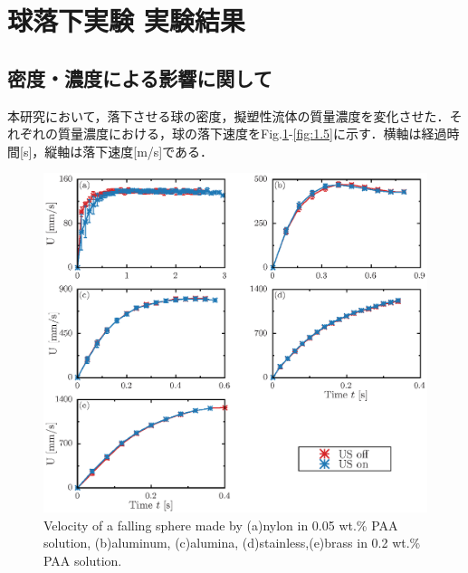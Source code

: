 \section{球落下実験 実験結果}
\label{sec:expData}

\subsection{密度・濃度による影響に関して}
本研究において，落下させる球の密度，擬塑性流体の質量濃度を変化させた．それぞれの質量濃度における，球の落下速度をFig.\ref{fig:0.05-0.2}-\ref{fig:1.5}に示す．横軸は経過時間[s]，縦軸は落下速度[m/s]である．

\begin{figure}[h]
    \centering
    \includegraphics[width=1.0\textwidth]{5-Results/0.05-0.2.eps}
    \caption{Velocity of a falling sphere made by (a)nylon in 0.05 wt.\% PAA solution, (b)aluminum, (c)alumina, (d)stainless,(e)brass in 0.2 wt.\% PAA solution.}
    \label{fig:0.05-0.2}
\end{figure}

